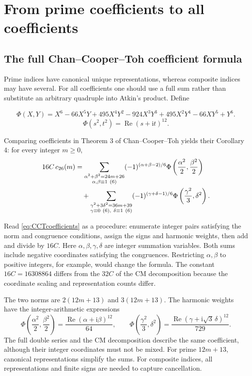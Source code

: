 \documentclass[a4paper,11pt]{article}
\theoremstyle{definition}
\DeclareMathOperator{\Repart}{Re}
\newcommand{\iu}{\mathrm i}
\begin{document}
\section{From prime coefficients to all coefficients}
\subsection{The full Chan--Cooper--Toh coefficient formula}
Prime indices have canonical unique representations, whereas composite
indices may have several. For all coefficients one should use a full
sum rather than substitute an arbitrary quadruple into Atkin's product.
Define

\begin{equation}\label{eq:Phi}
 \Phi(X,Y)=X^6-66X^5Y+495X^4Y^2-924X^3Y^3
             +495X^2Y^4-66XY^5+Y^6.
\end{equation}
\begin{equation}\label{eq:Phiharmonic}
 \Phi(s^2,t^2)=\Repart(s+\iu t)^{12}.
\end{equation}

Comparing coefficients in Theorem 3 of Chan--Cooper--Toh yields their
Corollary 4: for every integer \(m\geq0\), \cite{ChanCooperToh2006}
\begin{align}
 16C\,c_{26}(m)
 &=\sum_{\substack{\alpha^2+\beta^2=24m+26\\
                  \alpha,\beta\equiv1\ (6)}}
    (-1)^{(\alpha+\beta-2)/6}
       \Phi\left(\frac{\alpha^2}{2},\frac{\beta^2}{2}\right)
       \notag\\
 &\quad{}+
   \sum_{\substack{\gamma^2+3\delta^2=36m+39\\
                  \gamma\equiv0\ (6),\ \delta\equiv1\ (6)}}
    (-1)^{(\gamma+\delta-1)/6}
       \Phi\left(\frac{\gamma^2}{3},\delta^2\right).
 \label{eq:CCTcoefficients}
\end{align}

Read \eqref{eq:CCTcoefficients} as a procedure: enumerate integer pairs
satisfying the norm and congruence conditions, assign the signs and harmonic weights,
then add and divide by \(16C\).
Here \(\alpha,\beta,\gamma,\delta\) are integer summation variables.
Both sums include negative coordinates satisfying the congruences. Restricting \(\alpha,\beta\) to positive
integers, for example, would change the formula.
The constant \(16C=16308864\) differs from the \(32C\) of the CM
decomposition because the coordinate scaling and representation counts differ.

The two norms are \(2(12m+13)\) and \(3(12m+13)\).
The harmonic weights have the integer-arithmetic expressions
\[
 \Phi\left(\frac{\alpha^2}{2},\frac{\beta^2}{2}\right)
 =\frac{\Repart(\alpha+\iu\beta)^{12}}{64},\qquad
 \Phi\left(\frac{\gamma^2}{3},\delta^2\right)
 =\frac{\Repart(\gamma+\iu\sqrt3\,\delta)^{12}}{729}.
\]
The full double series and the CM decomposition describe the same
coefficient, although their integer coordinates must not be mixed.
For prime \(12m+13\), canonical representations simplify the sums.
For composite indices, all representations and finite signs are
needed to capture cancellation.
\end{document}
